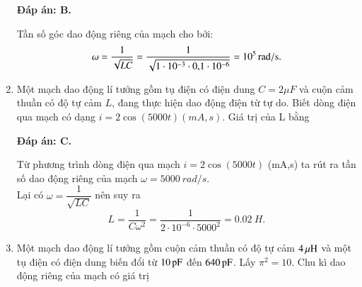 \begin{enumerate}[label=\bfseries Câu \arabic*:]
	\hideall
	{		\textbf{Đáp án: B.}
		
		Tần số góc dao động riêng của mạch cho bởi:
		$$\omega = \dfrac{1}{\sqrt{LC}} = \dfrac{1}{\sqrt{1\cdot10^{-3}\cdot \text{0,1}\cdot10^{-6}}} = \xsi{10^{5}}{rad/s}.$$
		
	}
	
	\item {}
	
	{Một mạch dao động lí tưởng gồm tụ điện có điện dung $C = 2 \mu F$ và cuộn cảm thuần có độ tự cảm $L$, đang thực hiện dao động điện từ tự do. Biết dòng điện qua mạch có dạng $i = 2 \cos \left( 5000t \right)(mA,s)$. Giá trị của L bằng
	}
	
	\hideall
	{		\textbf{Đáp án: C.}
		
		Từ phương trình dòng điện qua mạch $i = 2 \cos \left( 5000t \right)$ (mA,s) ta rút ra tần số dao động riêng của mạch $\omega = \SI{5000}{rad/s}$. \\
		Lại có $\omega = \dfrac{1}{\sqrt{LC}}$ nên suy ra 
		$$L = \dfrac{1}{C \omega^2} = \dfrac{1}{2\cdot10^{-6} \cdot 5000^2} = \SI{0,02}{H}.$$ 
		
	}
	

	\item {}
	
	{Một mạch dao động lí tưởng gồm cuộn cảm thuần có độ tự cảm $\xsi{4}{\mu H}$ và một tụ điện có điện dung biến đổi từ $\xsi{10}{pF}$ đến $\xsi{640}{pF}$. Lấy $\pi^2 = 10$. Chu kì dao động riêng của mạch có giá trị
	}
	

\end{enumerate}
